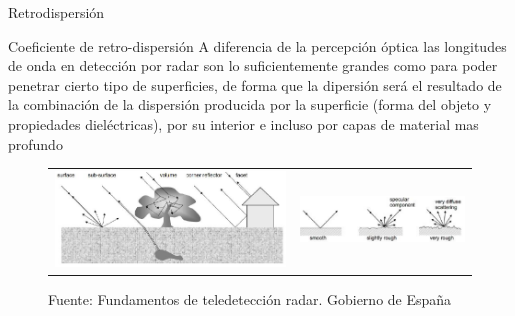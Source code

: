 \begin{frame}{Retrodispersión}
  \footnotesize
  \begin{block}{Coeficiente de retro-dispersión}
    A diferencia de la percepción óptica las longitudes de onda en detección por radar son lo suficientemente grandes como para poder penetrar cierto tipo de superficies, de forma que la dipersión será el resultado de la combinación de la dispersión producida por la superficie (forma del objeto y propiedades dieléctricas), por su interior e incluso por capas de material mas profundo
  \end{block}

  \begin{figure}
    \begin{center}
      \begin{tabular}[c]{ll}
        \includegraphics[scale=0.3]{img/section_03/principio_05} &
        \includegraphics[scale=0.4]{img/section_03/principio_06} \\
      \end{tabular}
    \end{center}
    \caption{Fuente: Fundamentos de teledetección radar. Gobierno de España}
    \label{fig:resolucion_temporal}
  \end{figure}
\end{frame}

